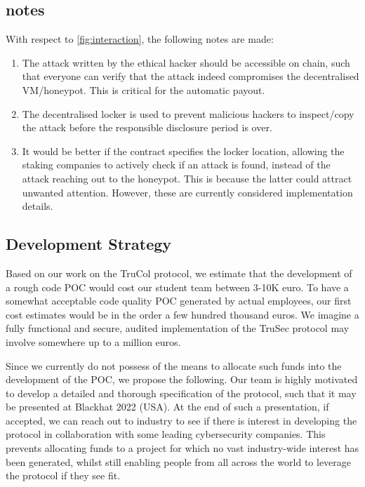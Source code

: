 \subsection{ notes}
With respect to \cref{fig:interaction}, the following notes are made:
\begin{enumerate} 
    \item The attack written by the ethical hacker should be accessible on chain, such that everyone can verify that the attack indeed compromises the decentralised VM/honeypot. This is critical for the automatic payout.
    \item The decentralised locker is used to prevent malicious hackers to inspect/copy the attack before the responsible disclosure period is over.
    \item It would be better if the contract specifies the locker location, allowing the staking companies to actively check if an attack is found, instead of the attack reaching out to the honeypot. This is because the latter could attract unwanted attention. However, these are currently considered implementation details.
\end{enumerate}


\subsection{Development Strategy}
Based on our work on the TruCol protocol, we estimate that the development of a rough code POC would cost our student team between 3-10K euro. To have a somewhat acceptable code quality POC generated by actual employees, our first cost estimates would be in the order a few hundred thousand euros. We imagine a fully functional and secure, audited implementation of the TruSec protocol may involve somewhere up to a million euros. 

Since we currently do not possess of the means to allocate such funds into the development of the POC, we propose the following. Our team is highly motivated to develop a detailed and thorough specification of the protocol, such that it may be presented at Blackhat 2022 (USA). At the end of such a presentation, if accepted, we can reach out to industry to see if there is interest in developing the protocol in collaboration with some leading cybersecurity companies. This prevents allocating funds to a project for which no vast industry-wide interest has been generated, whilst still enabling people from all across the world to leverage the protocol if they see fit.